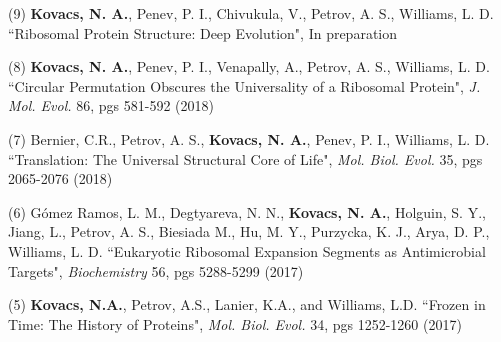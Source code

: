 

\begin{cvpublications}


\cvpublication
{(9) {\bf Kovacs, N. A.}, Penev, P. I., Chivukula, V., Petrov, A. S., Williams, L. D. ``Ribosomal Protein Structure: Deep Evolution", In preparation}
\vspace{-4.0mm}


{(8) {\bf Kovacs, N. A.}, Penev, P. I., Venapally, A., Petrov, A. S., Williams, L. D. ``Circular Permutation Obscures the Universality of a Ribosomal Protein", {\it J. Mol. Evol.} 86, pgs 581-592 (2018)}


{(7) Bernier, C.R., Petrov, A. S., {\bf Kovacs, N. A.},  Penev, P. I., Williams, L. D. ``Translation: The Universal Structural Core of Life", {\it Mol. Biol. Evol.} 35, pgs 2065-2076 (2018)}


{(6) G{\'o}mez Ramos, L. M., Degtyareva, N. N., {\bf Kovacs, N. A.}, Holguin, S. Y., Jiang, L., Petrov, A. S., Biesiada M., Hu, M. Y., Purzycka, K. J., Arya, D. P., Williams, L. D. ``Eukaryotic Ribosomal Expansion Segments as Antimicrobial Targets", {\it Biochemistry} 56, pgs 5288-5299 (2017)}


\cvpublication
{(5) {\bf Kovacs, N.A.}, Petrov, A.S., Lanier, K.A., and Williams, L.D. ``Frozen in Time: The History of Proteins", {\it Mol. Biol. Evol.} 34, pgs 1252-1260 (2017)}
\vspace{-4.0mm}


\end{cvpublications}
